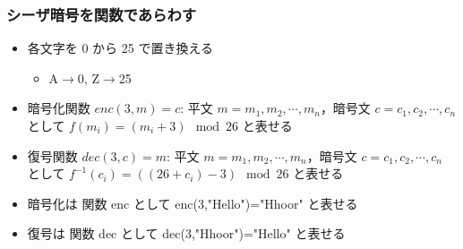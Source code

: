 \begin{frame}
\frametitle{シーザ暗号を関数であらわす}
  \begin{itemize}
\item 各文字を 0 から 25 で置き換える
    \begin{itemize}
\item A$\rightarrow$0, Z$\rightarrow$25
    \end{itemize}
\item 暗号化関数 \(\mathit{enc}(3,m)=c\): 平文 \(m=m_1,m_2,\cdots,m_n\)，暗号文 \(c=c_1,c_2,\cdots,c_n\) として \(f(m_i)=(m_i+3)\mod 26\) と表せる
\item 復号関数 \(\mathit{dec}(3,c)=m\): 平文 \(m=m_1,m_2,\cdots,m_n\)，暗号文 \(c=c_1,c_2,\cdots,c_n\) として \(f^{-1}(c_i)=((26+c_i)-3)\mod 26\) と表せる
  \end{itemize}
  \begin{center}
    \begin{example}
      \begin{itemize}
\item 暗号化は 関数 enc として enc(3,"Hello")="Hhoor" と表せる
\item 復号は 関数 dec として dec(3,"Hhoor")="Hello" と表せる
      \end{itemize}
    \end{example}
  \end{center}
\end{frame}
%
%
